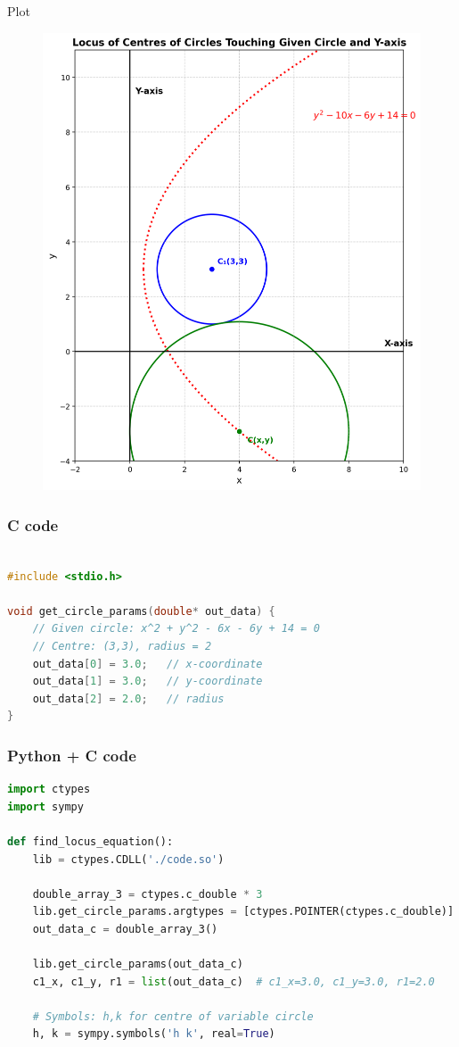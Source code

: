 \documentclass{beamer}
\begin{document}
\begin{frame}{Plot}
\begin{figure}[H]
    \centering
    \includegraphics[width=0.5\linewidth]{figs/fig.png}
    \label{fig:placeholder}
\end{figure}
\end{frame}
\begin{frame}[fragile]
\frametitle{C code}
    \begin{lstlisting}[language=C]

#include <stdio.h>

void get_circle_params(double* out_data) {
    // Given circle: x^2 + y^2 - 6x - 6y + 14 = 0
    // Centre: (3,3), radius = 2
    out_data[0] = 3.0;   // x-coordinate
    out_data[1] = 3.0;   // y-coordinate
    out_data[2] = 2.0;   // radius
}
\end{lstlisting}
\end{frame}
\begin{frame}[fragile]
    \frametitle{Python + C code}

    \begin{lstlisting}[language=Python]
import ctypes
import sympy

def find_locus_equation():
    lib = ctypes.CDLL('./code.so')

    double_array_3 = ctypes.c_double * 3
    lib.get_circle_params.argtypes = [ctypes.POINTER(ctypes.c_double)]
    out_data_c = double_array_3()

    lib.get_circle_params(out_data_c)
    c1_x, c1_y, r1 = list(out_data_c)  # c1_x=3.0, c1_y=3.0, r1=2.0

    # Symbols: h,k for centre of variable circle
    h, k = sympy.symbols('h k', real=True)
\end{lstlisting}
\end{frame}
\end{document}

